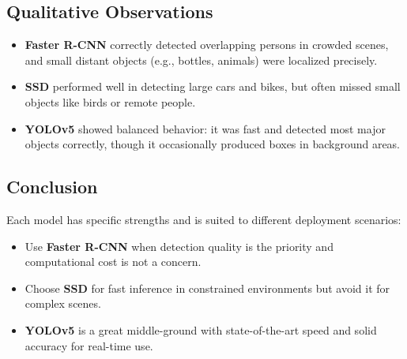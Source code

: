 \documentclass[12pt]{article}
\begin{document}
\subsection*{Qualitative Observations}

\begin{itemize}
    \item \textbf{Faster R-CNN} correctly detected overlapping persons in crowded scenes, and small distant objects (e.g., bottles, animals) were localized precisely.
    \item \textbf{SSD} performed well in detecting large cars and bikes, but often missed small objects like birds or remote people.
    \item \textbf{YOLOv5} showed balanced behavior: it was fast and detected most major objects correctly, though it occasionally produced boxes in background areas.
\end{itemize}

\subsection*{Conclusion}

Each model has specific strengths and is suited to different deployment scenarios:

\begin{itemize}
    \item Use \textbf{Faster R-CNN} when detection quality is the priority and computational cost is not a concern.
    \item Choose \textbf{SSD} for fast inference in constrained environments but avoid it for complex scenes.
    \item \textbf{YOLOv5} is a great middle-ground with state-of-the-art speed and solid accuracy for real-time use.
\end{itemize}
\end{document}
